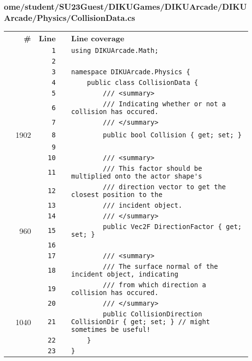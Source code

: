 \documentclass[a4paper,landscape,10pt]{article}
\begin{document}
\subsubsection{ome/student/SU23Guest/DIKUGames/DIKUArcade/DIKUArcade/Physics/CollisionData.cs}
\begin{longtable}[l]{lrrll}
\textbf{} & \textbf{\#} & \textbf{Line} & \textbf{} & \textbf{Line coverage}\\
\cellcolor{gray} &  & \verb~1~ & & \verb~using DIKUArcade.Math;~\\
\cellcolor{gray} &  & \verb~2~ & & \verb~~\\
\cellcolor{gray} &  & \verb~3~ & & \verb~namespace DIKUArcade.Physics {~\\
\cellcolor{gray} &  & \verb~4~ & & \verb~    public class CollisionData {~\\
\cellcolor{gray} &  & \verb~5~ & & \verb~        /// <summary>~\\
\cellcolor{gray} &  & \verb~6~ & & \verb~        /// Indicating whether or not a collision has occured.~\\
\cellcolor{gray} &  & \verb~7~ & & \verb~        /// </summary>~\\
\cellcolor{green} & 1902 & \verb~8~ & & \verb~        public bool Collision { get; set; }~\\
\cellcolor{gray} &  & \verb~9~ & & \verb~~\\
\cellcolor{gray} &  & \verb~10~ & & \verb~        /// <summary>~\\
\cellcolor{gray} &  & \verb~11~ & & \verb~        /// This factor should be multiplied onto the actor shape's~\\
\cellcolor{gray} &  & \verb~12~ & & \verb~        /// direction vector to get the closest position to the~\\
\cellcolor{gray} &  & \verb~13~ & & \verb~        /// incident object.~\\
\cellcolor{gray} &  & \verb~14~ & & \verb~        /// </summary>~\\
\cellcolor{green} & 960 & \verb~15~ & & \verb~        public Vec2F DirectionFactor { get; set; }~\\
\cellcolor{gray} &  & \verb~16~ & & \verb~~\\
\cellcolor{gray} &  & \verb~17~ & & \verb~        /// <summary>~\\
\cellcolor{gray} &  & \verb~18~ & & \verb~        /// The surface normal of the incident object, indicating~\\
\cellcolor{gray} &  & \verb~19~ & & \verb~        /// from which direction a collision has occured.~\\
\cellcolor{gray} &  & \verb~20~ & & \verb~        /// </summary>~\\
\cellcolor{green} & 1040 & \verb~21~ & & \verb~        public CollisionDirection CollisionDir { get; set; } // might sometimes be useful!~\\
\cellcolor{gray} &  & \verb~22~ & & \verb~    }~\\
\cellcolor{gray} &  & \verb~23~ & & \verb~}~\\
\end{longtable}
\newpage
\end{document}
